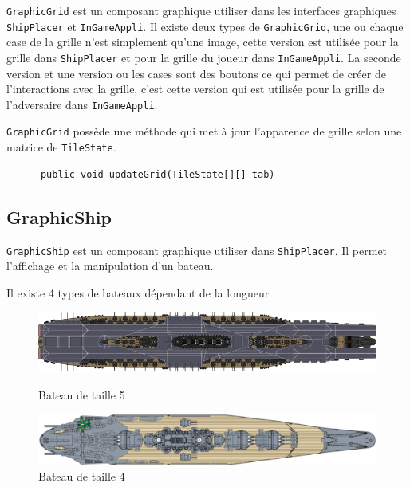 \documentclass[12pt]{article}
\begin{document}
\texttt{GraphicGrid} est un composant graphique utiliser dans les interfaces
graphiques \texttt{ShipPlacer} et \texttt{InGameAppli}. Il existe deux types de
\texttt{GraphicGrid}, une ou chaque case de la grille n'est simplement qu'une
image, cette version est utilisée pour la grille dans \texttt{ShipPlacer} et
pour la grille du joueur dans \texttt{InGameAppli}. La seconde version et une
version ou les cases sont des boutons ce qui permet de créer de l'interactions
avec la grille, c'est cette version qui est utilisée pour la grille de
l'adversaire dans \texttt{InGameAppli}.

\bigskip

\texttt{GraphicGrid} possède une méthode qui met à jour l'apparence de grille
selon une matrice de \texttt{TileState}.
\begin{verbatim}
      public void updateGrid(TileState[][] tab)
\end{verbatim}

\bigskip

\subsection{GraphicShip}

\texttt{GraphicShip} est un composant graphique utiliser dans
\texttt{ShipPlacer}. Il permet l'affichage et la manipulation d'un bateau.

Il existe 4 types de bateaux dépendant de la longueur
\begin{figure}[H]
      \includegraphics[width=\linewidth]{images/image BN V2/ship5.png}
      \caption{Bateau de taille 5}
      \endminipage\hfill
      \includegraphics[width=\linewidth]{images/image BN V2/ship4.png}
      \caption{Bateau de taille 4}
      \endminipage\hfill
\end{figure}
\end{document}
